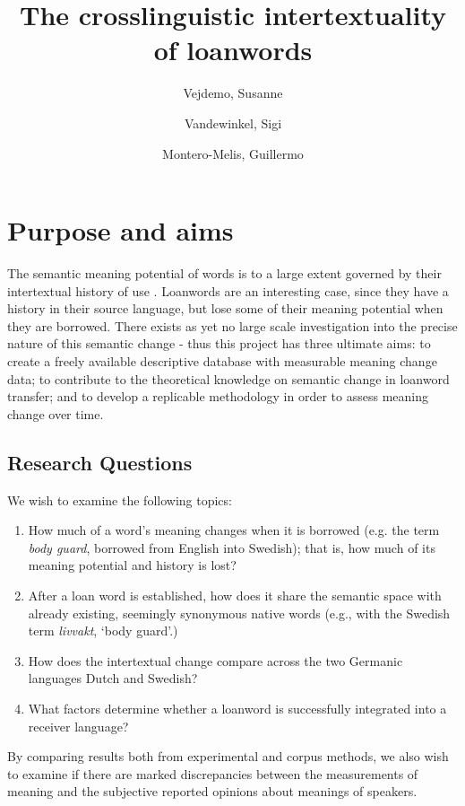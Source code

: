 \documentclass[a4paper]{article}
\title{The crosslinguistic intertextuality of loanwords}
\author{Vejdemo, Susanne \and Vandewinkel, Sigi \and Montero-Melis, Guillermo}
\begin{document}
\maketitle
\thispagestyle{fancy} %

\section{Purpose and aims}
The semantic meaning potential of words is to a large extent governed by their intertextual history of use \citep{Linell2005,Traugott2001}.
Loanwords are an interesting case, since they have a history in their source language, but lose some of their meaning potential when they are borrowed.
There exists as yet no large scale investigation into the precise nature of this semantic change - thus this project has three ultimate aims: to create a freely available descriptive database with measurable meaning change data; 
to contribute to the theoretical knowledge on semantic change in loanword transfer;
and to develop a replicable methodology in order to assess meaning change over time.

\subsection{Research Questions}

We wish to examine the following topics:
%
\begin{enumerate}
	\item  How much of a word's meaning changes when it is borrowed (e.g. the term \emph{body guard}, borrowed from English into Swedish); that is, how much of its meaning potential and history is lost?
	\item  After a loan word is established, how does it share the semantic space with already existing, seemingly synonymous native words (e.g., with the Swedish term \emph{livvakt}, `body guard'.)
	\item How does the intertextual change compare across the two Germanic languages Dutch and Swedish?
	\item What factors determine whether a loanword is successfully integrated into a receiver language?
\end{enumerate}
%
By comparing results both from experimental and corpus methods, we also wish to examine if there are marked discrepancies between the measurements of meaning and the subjective reported opinions about meanings of speakers.
\end{document}
